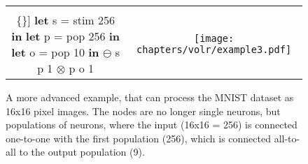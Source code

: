 \begin{figure}
  \ContinuedFloat
  \begin{tabular}[t]{c c}
    \begin{minipage}{0.4\textwidth}
      \begin{Verbatim}[mathescape,commandchars=\\\{\}]
\textbf{let} s = stim 256 \textbf{in}
  \textbf{let} p = pop 256 \textbf{in}
    \textbf{let} o = pop 10 \textbf{in}
      $\ominus$ s p 1
      $\otimes$ p o 1
      \end{Verbatim}
    \end{minipage} & \begin{minipage}{0.6\textwidth}
      \texttt{[image: chapters/volr/example3.pdf]}
    \end{minipage}
  \end{tabular}
  \caption{A more advanced example, that can process the MNIST dataset
    as 16x16 pixel images. 
    The nodes are no longer single neurons, but populations of neurons,
    where the input (16x16 = 256) is connected one-to-one
    with the first population (256), which is connected all-to-all to the 
    output population (9).}
  \label{fig:volr-example2}
\end{figure}